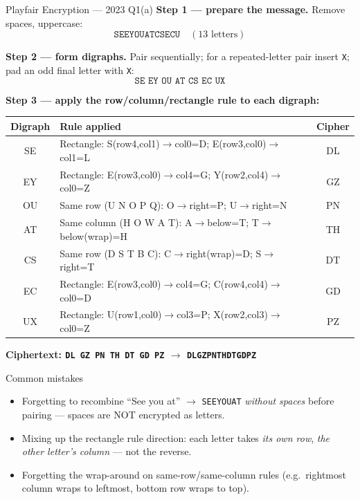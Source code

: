 \documentclass[12pt,a4paper]{article}
\begin{document}
\begin{solbox}{Playfair Encryption --- 2023 Q1(a)}
\textbf{Step 1 --- prepare the message.} Remove spaces, uppercase:
\[ \texttt{SEEYOUATCSECU} \quad (13 \text{ letters}) \]

\textbf{Step 2 --- form digraphs.} Pair sequentially; for a repeated-letter pair insert \texttt{X}; pad an odd final letter with \texttt{X}:
\[ \texttt{SE\ EY\ OU\ AT\ CS\ EC\ UX} \]

\textbf{Step 3 --- apply the row/column/rectangle rule to each digraph:}

\begin{center}
\renewcommand{\arraystretch}{1.3}
\begin{tabular}{c|l|c}
\toprule
Digraph & Rule applied & Cipher \\
\midrule
SE & Rectangle: S(row4,col1)$\to$col0=D; E(row3,col0)$\to$col1=L & DL \\
EY & Rectangle: E(row3,col0)$\to$col4=G; Y(row2,col4)$\to$col0=Z & GZ \\
OU & Same row (U N O P Q): O$\to$right=P; U$\to$right=N & PN \\
AT & Same column (H O W A T): A$\to$below=T; T$\to$below(wrap)=H & TH \\
CS & Same row (D S T B C): C$\to$right(wrap)=D; S$\to$right=T & DT \\
EC & Rectangle: E(row3,col0)$\to$col4=G; C(row4,col4)$\to$col0=D & GD \\
UX & Rectangle: U(row1,col0)$\to$col3=P; X(row2,col3)$\to$col0=Z & PZ \\
\bottomrule
\end{tabular}
\end{center}

\textbf{Ciphertext: \texttt{DL GZ PN TH DT GD PZ} $\to$ \texttt{DLGZPNTHDTGDPZ}}
\end{solbox}

\begin{warnbox}{Common mistakes}
\begin{itemize}[noitemsep]
  \item Forgetting to recombine ``See you at'' $\to$ \texttt{SEEYOUAT} \emph{without spaces} before pairing --- spaces are NOT encrypted as letters.
  \item Mixing up the rectangle rule direction: each letter takes \emph{its own row}, \emph{the other letter's column} --- not the reverse.
  \item Forgetting the wrap-around on same-row/same-column rules (e.g.\ rightmost column wraps to leftmost, bottom row wraps to top).
\end{itemize}
\end{warnbox}
\end{document}
